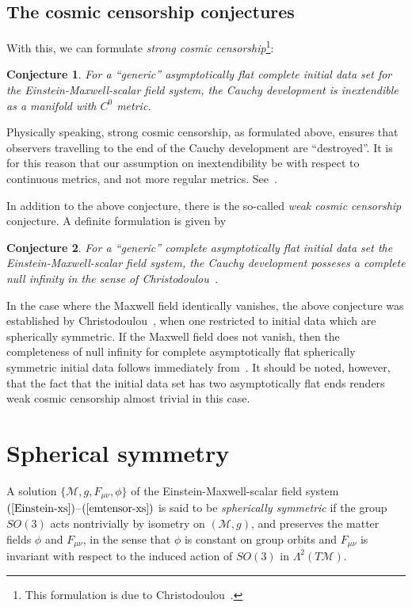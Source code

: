 \documentclass{article}
\newtheorem{conjecture}{Conjecture}[section]
\begin{document}
\subsection{The cosmic censorship conjectures}
\label{eikasies}
With this, we can formulate \emph{strong cosmic censorship}\footnote{This
formulation is due to Christodoulou~\cite{chr:givp}.}:
\begin{conjecture}
\label{scc}
For a ``generic'' asymptotically flat complete
initial data set for the Einstein-Maxwell-scalar field system,
the Cauchy development is inextendible as a manifold with $C^0$ metric.
\end{conjecture}

Physically speaking, strong cosmic censorship, as formulated above,
ensures that observers
travelling to the end of the Cauchy development are ``destroyed''.
It is for this reason that our assumption on inextendibility be
with respect to continuous metrics, and not more regular metrics. 
See~\cite{chr:givp}.

In addition to the above conjecture, there is the so-called
\emph{weak cosmic censorship} conjecture. A definite formulation 
is given by
\begin{conjecture} 
\label{wcccon}
For a ``generic'' complete asymptotically flat
initial data set the Einstein-Maxwell-scalar field system,
the Cauchy development posseses a complete null infinity in the sense of
Christodoulou~\cite{chr:givp}.
\end{conjecture}
In the case where the Maxwell field identically vanishes, the 
above conjecture was
established by Christodoulou~\cite{chr:ins}, when one restricted to initial data
which are spherically symmetric. If the Maxwell field does not vanish,
then the completeness of null infinity for complete asymptotically flat
spherically symmetric initial data
follows immediately from~\cite{md:sssts}. It should be noted, however, 
that the fact that the initial data set has two asymptotically flat ends renders
weak cosmic censorship almost trivial
in this case.














\section{Spherical symmetry}
\label{sphsymsec}
A solution $\{\mathcal{M},g,F_{\mu\nu}, \phi\}$
of the Einstein-Maxwell-scalar 
field system $(\ref{Einstein-xs})$--$(\ref{emtensor-xs})$ is said to be
\emph{spherically symmetric} if the group $SO(3)$ acts nontrivially
by isometry on $(\mathcal{M}, g)$, and preserves the matter fields $\phi$
and $F_{\mu\nu}$,
in the sense that $\phi$ is constant on group orbits and
$F_{\mu\nu}$ is invariant with respect to the induced action of $SO(3)$
in $\Lambda^2(T\mathcal{M})$.
\end{document}
